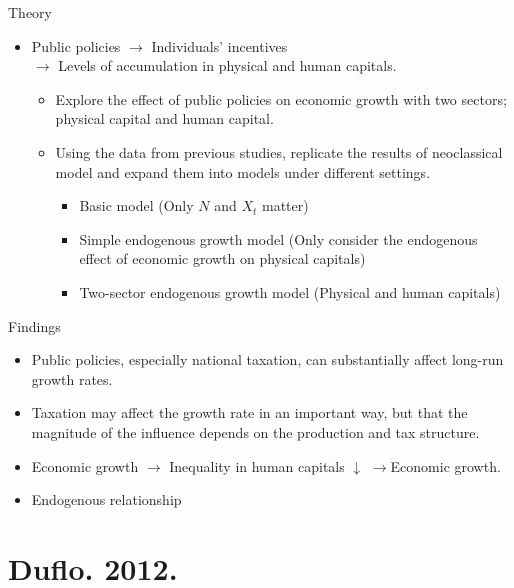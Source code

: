 \documentclass[xcolor=dvipsnames, t]{beamer}
\begin{document}
	\begin{frame}[fragile]{Theory}
		\citet{king:rebelo:1990}
		\begin{itemize}
			\item Public policies $\rightarrow$ Individuals' incentives\\$\rightarrow$ Levels of accumulation in physical and human capitals.
			\begin{itemize}
				\item Explore the effect of public policies on economic growth with two sectors; physical capital and human capital.
				\item Using the data from previous studies, \citet{king:rebelo:1990} replicate the results of neoclassical model and expand them into models under different settings.\pause
				\begin{itemize}
					\item Basic model (Only $N$ and $X_t$ matter)
					\item Simple endogenous growth model (Only consider the endogenous effect of economic growth on physical capitals) \item Two-sector endogenous growth model (Physical and human capitals)
				\end{itemize}
			\end{itemize}
		\end{itemize}
	\end{frame}
	
	\begin{frame}[fragile]{Findings}
		\begin{itemize}
			\item Public policies, especially national taxation, can substantially affect long-run growth rates. \pause
			\item Taxation may affect the growth rate in an important way, but that the magnitude of the influence depends on the production and tax structure. \pause
			\item Economic growth $\rightarrow$ Inequality in human capitals $\downarrow$ $\rightarrow$Economic growth. \pause
			\item Endogenous relationship
		\end{itemize}
	\end{frame}
	
	\section{Duflo. 2012.}
\end{document}
